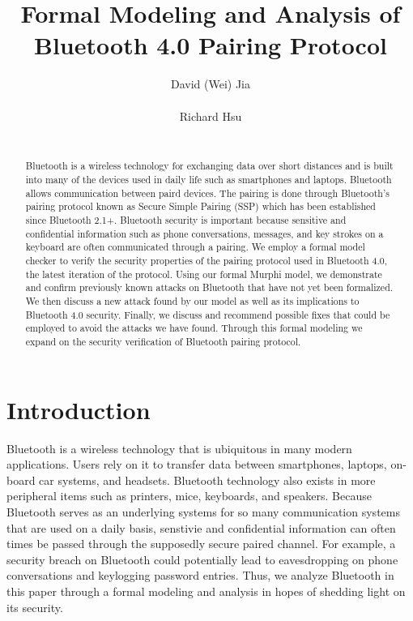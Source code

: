 \documentclass{acm_proc_article-sp}
\begin{document}
\title{Formal Modeling and Analysis of \\ Bluetooth 4.0 Pairing Protocol}
\author{
    \alignauthor David (Wei) Jia \\
		 \\
	\alignauthor Richard Hsu \\
	     \\
}

\maketitle

\begin{abstract}
Bluetooth is a wireless technology for exchanging data over short distances and is built into many of the devices used in daily life such as smartphones and laptops. Bluetooth allows communication between paird devices. The pairing is done through Bluetooth's pairing protocol known as Secure Simple Pairing (SSP) which has been established since Bluetooth 2.1+. Bluetooth security is important because sensitive and confidential information such as phone conversations, messages, and key strokes on a keyboard are often communicated through a pairing. We employ a formal model checker to verify the security properties of the pairing protocol used in Bluetooth 4.0, the latest iteration of the protocol. Using our formal Murphi model, we demonstrate and confirm previously known attacks on Bluetooth that have not yet been formalized. We then discuss a new attack found by our model as well as its implications to Bluetooth 4.0 security. Finally, we discuss and recommend possible fixes that could be employed to avoid the attacks we have found. Through this formal modeling we expand on the security verification of Bluetooth pairing protocol.
\end{abstract}


\section{Introduction}

Bluetooth is a wireless technology that is ubiquitous in many modern applications. Users rely on it to transfer data between smartphones, laptops, on-board car systems, and headsets. Bluetooth technology also exists in more peripheral items such as printers, mice, keyboards, and speakers. Because Bluetooth serves as an underlying systems for so many communication systems that are used on a daily basis, senstivie and confidential information can often times be passed through the supposedly secure paired channel. For example, a security breach on Bluetooth could potentially lead to eavesdropping on phone conversations and keylogging password entries. Thus, we analyze Bluetooth in this paper through a formal modeling and analysis in hopes of shedding light on its security.
\end{document}
